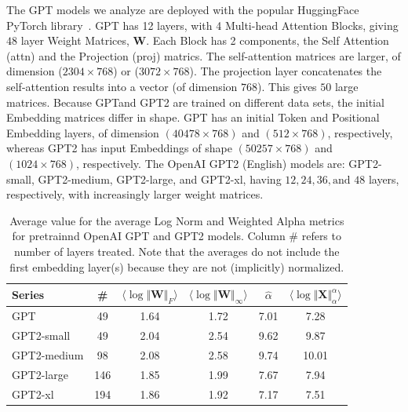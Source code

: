 The GPT models we analyze are deployed with the popular HuggingFace PyTorch library~\cite{huggingface}.
GPT has 12 layers, with 4 Multi-head Attention Blocks, giving $48$ layer Weight Matrices, $\mathbf{W}$.
Each Block has 2 components, the Self Attention (attn) and the Projection (proj) matrics.  
The self-attention  matrices are larger, of dimension ($2304\times 768$) or ($3072\times 768$).
The projection layer concatenates the self-attention results into a vector (of dimension $768$).
This gives $50$ large matrices.
%
Because GPTand GPT2 are trained on different data sets, the initial Embedding matrices differ in shape.
GPT has an initial Token and Positional Embedding layers, of dimension $(40478\times 768)$ and $(512\times 768)$, respectively, whereas GPT2 has input Embeddings of shape $(50257\times 768)$ and $(1024\times 768)$, respectively. 
%
The OpenAI GPT2 (English) models are: GPT2-small, GPT2-medium, GPT2-large, and GPT2-xl, having $12, 24, 36, \text{and } 48$ layers, respectively, with increasingly larger weight matrices.


\begin{table}[t]
\small
\begin{center}
\begin{tabular}{|p{0.67in}|c|c|c|c|c|}
\hline
 Series  & \#   & $\langle\log\Vert\mathbf{W}\Vert_{F}\rangle$ & $\langle\log\Vert\mathbf{W}\Vert_{\infty}\rangle$ & $\hat{\alpha}$ & $\langle\log\Vert\mathbf{X}\Vert^{\alpha}_{\alpha}\rangle$ \\
\hline
GPT & 49 & 1.64  & 1.72 & 7.01 & 7.28 \\
GPT2-small & 49 & 2.04  & 2.54& 9.62 & 9.87 \\
\hline
GPT2-medium & 98 & 2.08 & 2.58& 9.74 & 10.01 \\
GPT2-large & 146 & 1.85 & 1.99& 7.67 & 7.94 \\
GPT2-xl & 194 & 1.86 & 1.92 & 7.17 & 7.51 \\
\hline
\end{tabular}
\end{center}
\caption{Average value for the average Log Norm and Weighted Alpha metrics for pretrainnd OpenAI GPT and GPT2 models. Column \# refers to number of layers treated.  Note that the averages do not include the first embedding layer(s) because they are not (implicitly) normalized.  }
\label{table:nlp}
\end{table}


